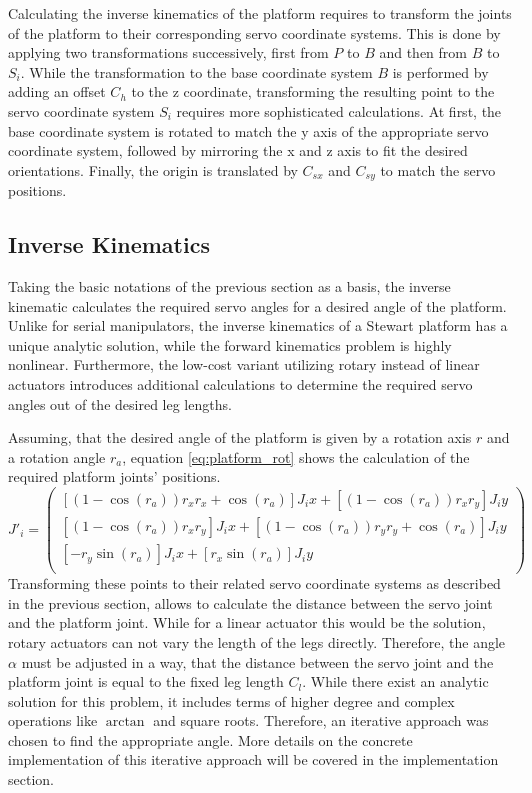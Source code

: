 Calculating the inverse kinematics of the platform requires to transform the
joints of the platform to their corresponding servo coordinate systems. This
is done by applying two transformations successively, first from $P$ to $B$
and then from $B$ to $S_i$. While the transformation to the base coordinate
system $B$ is performed by adding an offset $C_h$ to the z coordinate,
transforming the resulting point to the servo coordinate system $S_i$ requires
more sophisticated calculations. At first, the base coordinate system is
rotated to match the y axis of the appropriate servo coordinate system,
followed by mirroring the x and z axis to fit the desired orientations.
Finally, the origin is translated by $C_{sx}$ and $C_{sy}$ to match the servo
positions.

\subsection{Inverse Kinematics}
Taking the basic notations of the previous section as a basis, the inverse
kinematic calculates the required servo angles for a desired angle of the
platform. Unlike for serial manipulators, the inverse kinematics of a Stewart
platform has a unique analytic solution, while the forward kinematics problem
is highly nonlinear. Furthermore, the low-cost variant utilizing rotary
instead of linear actuators introduces additional calculations to determine
the required servo angles out of the desired leg lengths.

Assuming, that the desired angle of the platform is given by a rotation axis
$r$ and a rotation angle $r_a$, equation \ref{eq:platform_rot} shows the
calculation of the required platform joints' positions.
\begin{equation}
J'_i = 
\begin{pmatrix}
\left[\left(1 - \cos(r_a)\right) r_x r_x + \cos(r_a)\right] J_ix + \left[\left(1 - \cos(r_a)\right) r_x r_y\right] J_iy\\
\left[\left(1 - \cos(r_a)\right) r_x r_y\right] J_ix + \left[\left(1 - \cos(r_a)\right) r_y r_y + \cos(r_a)\right] J_iy\\
\left[-r_y \sin(r_a)\right] J_ix + \left[r_x \sin(r_a)\right] J_iy\\
\end{pmatrix}
\label{eq:platform_rot}
\end{equation}
Transforming these points to their related servo coordinate systems as
described in the previous section, allows to calculate the distance between
the servo joint and the platform joint. While for a linear actuator this would
be the solution, rotary actuators can not vary the length of the legs
directly. Therefore, the angle $\alpha$ must be adjusted in a way, that the
distance between the servo joint and the platform joint is equal to the fixed
leg length $C_l$. While there exist an analytic solution for this problem, it
includes terms of higher degree and complex operations like $\arctan$ and
square roots. Therefore, an iterative approach was chosen to find the
appropriate angle. More details on the concrete implementation of this
iterative approach will be covered in the implementation section.

